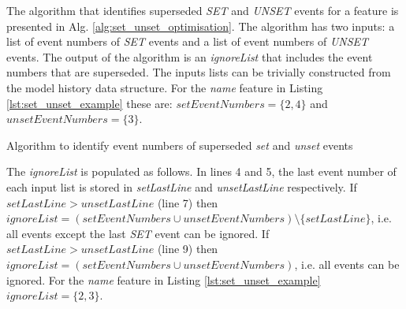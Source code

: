\documentclass{llncs}
\begin{document}
The algorithm that identifies superseded \emph{SET} and \emph{UNSET} events for a feature is presented in Alg. \ref{alg:set_unset_optimisation}.
The algorithm has two inputs: a list of event numbers of \emph{SET} events and a list of event numbers of \emph{UNSET} events.
The output of the algorithm is an \emph{ignoreList} that includes the event numbers that are superseded.
The inputs lists can be trivially constructed from the model history data structure.
For the \emph{name} feature in Listing \ref{lst:set_unset_example} these are: $setEventNumbers = \{2,4\}$ and $unsetEventNumbers = \{3\}$.

\begin{algorithm}[H]
\begin{small}
\end{small}
\caption{Algorithm to identify event numbers of superseded \emph{set} and \emph{unset} events}
\label{alg:set_unset_optimisation}
\end{algorithm}

The \emph{ignoreList} is populated as follows.
In lines 4 and 5, the last event number of each input list is stored in \emph{setLastLine} and \emph{unsetLastLine} respectively.
If $setLastLine > unsetLastLine$ (line 7) then $ignoreList = (setEventNumbers \cup unsetEventNumbers) \setminus  \{setLastLine\} $, i.e. all events except the last \emph{SET} event can be ignored.
If $setLastLine > unsetLastLine$ (line 9) then $ignoreList = (setEventNumbers \cup unsetEventNumbers)$, i.e. all events can be ignored.
For the \emph{name} feature in Listing \ref{lst:set_unset_example} $ignoreList = \{2, 3\}$.
\end{document}
